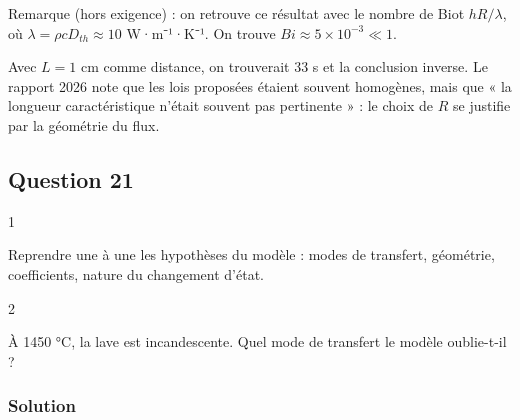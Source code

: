 \documentclass[11pt,a4paper]{article}
\begin{document}
Remarque (hors exigence) : on retrouve ce résultat avec le nombre de Biot \(hR/\lambda\), où \(\lambda = \rho c D_{th} \approx 10\) W·m⁻¹·K⁻¹. On trouve \(Bi \approx 5\times10^{-3} \ll 1\).

\begin{piege}

Avec \(L = 1\) cm comme distance, on trouverait 33 s et la conclusion inverse. Le rapport 2026 note que les lois proposées étaient souvent homogènes, mais que « la longueur caractéristique n'était souvent pas pertinente » : le choix de \(R\) se justifie par la géométrie du flux.

\end{piege}

\hypertarget{question-21}{%
\subsection{Question 21}\label{question-21}}

\begin{indication}{1}

Reprendre une à une les hypothèses du modèle : modes de transfert, géométrie, coefficients, nature du changement d'état.

\end{indication}

\begin{indication}{2}

À 1450 °C, la lave est incandescente. Quel mode de transfert le modèle oublie-t-il ?

\end{indication}

\hypertarget{solution-20}{%
\subsubsection{Solution}\label{solution-20}}
\end{document}
